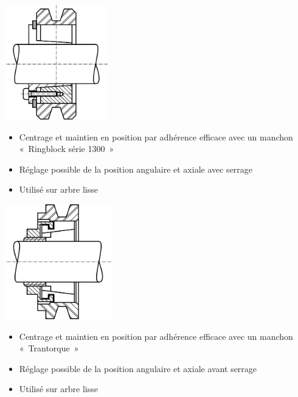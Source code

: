 \documentclass[11pt,oneside]{article}
\begin{document}
\noindent\begin{minipage}[c]{.45\linewidth}
 \begin{center}
  \includegraphics[height=5cm]{png/Fig11}
 \end{center}

\begin{itemize}
\item Centrage et maintien en position par adhérence efficace avec un manchon
«~Ringblock série 1300~»
\item Réglage possible de la position angulaire et axiale avec serrage
\item Utilisé sur arbre lisse
\end{itemize}
\end{minipage} \hfill
\noindent\begin{minipage}[c]{.45\linewidth}
 \begin{center}
  \includegraphics[height=5cm]{png/Fig12}
 \end{center}

\begin{itemize}
\item Centrage et maintien en position par adhérence efficace avec un manchon
«~Trantorque~»
\item Réglage possible de la position angulaire et axiale avant serrage
\item Utilisé sur arbre lisse
\end{itemize}
\end{minipage} 
\end{document}
